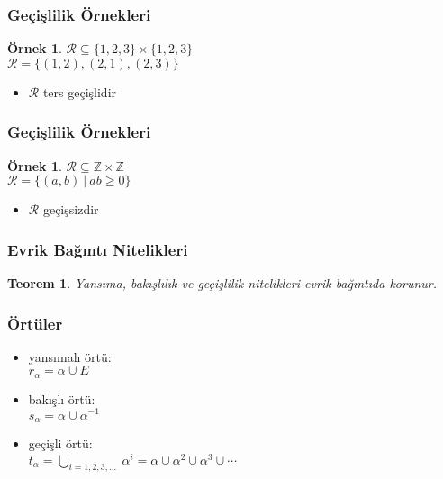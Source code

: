\documentclass[dvipsnames]{beamer}
\theoremstyle{definition}
\theoremstyle{example}
\newtheorem{ornek}[theorem]{Örnek}
\theoremstyle{plain}
\newtheorem{teorem}[theorem]{Teorem}
\begin{document}
\begin{frame}
  \frametitle{Geçişlilik Örnekleri}

  \begin{ornek}
    $\mathcal{R} \subseteq \{1,2,3\} \times \{1,2,3\}$\\
    $\mathcal{R} = \{(1,2), (2,1), (2,3)\}$

    \medskip
    \begin{itemize}
      \item $\mathcal{R}$ ters geçişlidir
    \end{itemize}
  \end{ornek}
\end{frame}

\begin{frame}
  \frametitle{Geçişlilik Örnekleri}

  \begin{ornek}
    $\mathcal{R} \subseteq \mathbb{Z} \times \mathbb{Z}$\\
    $\mathcal{R} = \{(a,b)~|~ab \geq 0\}$

    \medskip
    \begin{itemize}
      \item $\mathcal{R}$ geçişsizdir
    \end{itemize}
  \end{ornek}
\end{frame}

\begin{frame}
  \frametitle{Evrik Bağıntı Nitelikleri}

  \begin{teorem}
    Yansıma, bakışlılık ve geçişlilik nitelikleri evrik bağıntıda korunur.
  \end{teorem}
\end{frame}

\begin{frame}
  \frametitle{Örtüler}

  \begin{itemize}
    \item yansımalı örtü:\\
      $r_{\alpha} = \alpha \cup E$

    \pause
    \medskip
    \item bakışlı örtü:\\
      $s_{\alpha} = \alpha \cup \alpha^{-1}$

    \pause
    \medskip
    \item geçişli örtü:\\
      $t_{\alpha} = \bigcup_{i=1,2,3, \ldots}~\alpha^i
        = \alpha \cup \alpha^2 \cup \alpha^3 \cup \cdots$
  \end{itemize}
\end{frame}
\end{document}
